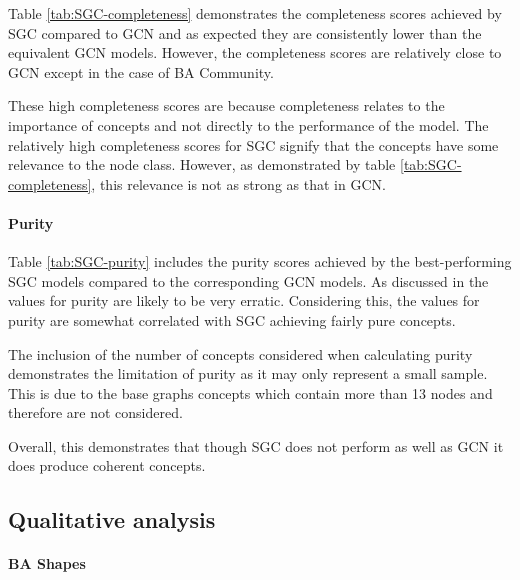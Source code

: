Table \ref{tab:SGC-completeness} demonstrates the completeness scores achieved by SGC compared to GCN and as expected they are consistently lower than the equivalent GCN models.
However, the completeness scores are relatively close to GCN except in the case of BA Community.

These high completeness scores are because completeness relates to the importance of concepts and not directly to the performance of the model.
The relatively high completeness scores for SGC signify that the concepts have some relevance to the node class.
However, as demonstrated by table \ref{tab:SGC-completeness}, this relevance is not as strong as that in GCN.

\paragraph{Purity}


Table \ref{tab:SGC-purity} includes the purity scores achieved by the best-performing SGC models compared to the corresponding GCN models.
As discussed in  the values for purity are likely to be very erratic.
Considering this, the values for purity are somewhat correlated with SGC achieving fairly pure concepts.

The inclusion of the number of concepts considered when calculating purity demonstrates the limitation of purity as it may only represent a small sample.
This is due to the base graphs concepts which contain more than 13 nodes and therefore are not considered.

Overall, this demonstrates that though SGC does not perform as well as GCN it does produce coherent concepts.

\subsection{Qualitative analysis}
\label{sec:concept-analysis}

\paragraph{BA Shapes}

